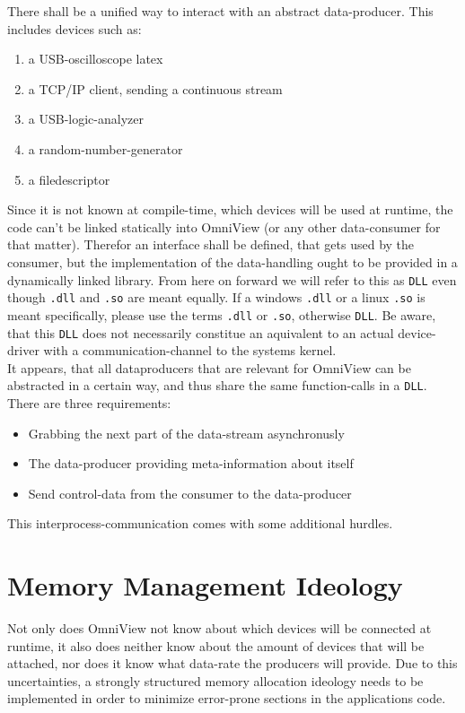 \documentclass[]{scrreprt}
\begin{document}
There shall be a unified way to interact with an abstract data-producer.
This includes devices such as:
\begin{enumerate}
    \item a USB-oscilloscope \gls{latex}
    \item a TCP/IP client, sending a continuous stream
    \item a USB-logic-analyzer
    \item a random-number-generator
    \item a filedescriptor
\end{enumerate}


Since it is not known at compile-time, which devices will be used at runtime, the code can't be linked statically into OmniView (or any other data-\gls{consumer} for that matter).
Therefor an interface shall be defined, that gets used by the consumer, but the implementation of the data-handling ought to be provided in a dynamically linked library.
From here on forward we will refer to this as \lstinline|DLL| even though \lstinline|.dll| and \lstinline|.so| are meant equally.
If a windows \lstinline|.dll| or a linux \lstinline|.so| is meant specifically, please use the terms \lstinline|.dll| or \lstinline|.so|, otherwise \lstinline|DLL|.
Be aware, that this \lstinline|DLL| does not necessarily constitue an aquivalent to an actual device-driver with a communication-channel to the systems kernel.
\\
It appears, that all dataproducers that are relevant for OmniView can be abstracted in a certain way, and thus share the same function-calls in a \lstinline|DLL|.
There are three requirements:
\begin{itemize}
    \item Grabbing the next part of the data-stream asynchronusly
    \item The data-producer providing meta-information about itself
    \item Send control-data from the consumer to the data-producer
\end{itemize}
This interprocess-communication comes with some additional hurdles.


\section{Memory Management Ideology}
Not only does OmniView not know about which devices will be connected at runtime, it also does neither know about the amount of devices that will be attached, nor does it know what data-rate the producers will provide.
Due to this uncertainties, a strongly structured memory allocation ideology needs to be implemented in order to minimize error-prone sections in the applications code.
\end{document}
